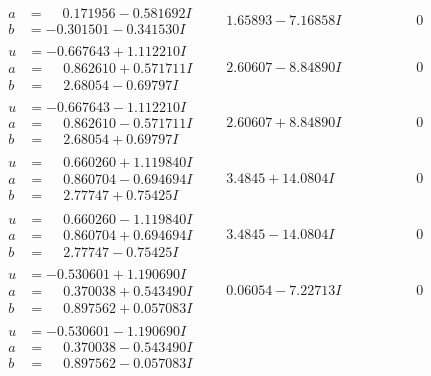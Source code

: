 \documentclass[1p]{elsarticle_modified}
\theoremstyle{definition}
\begin{document}
$$\begin{array}{c|c|c}
\begin{aligned}
a &= \phantom{-}0.171956 - 0.581692 I \\
b &= -0.301501 - 0.341530 I\end{aligned}
 & \phantom{-}1.65893 - 7.16858 I & \phantom{-0.000000 } 0 \\ \hline\begin{aligned}
u &= -0.667643 + 1.112210 I \\
a &= \phantom{-}0.862610 + 0.571711 I \\
b &= \phantom{-}2.68054 - 0.69797 I\end{aligned}
 & \phantom{-}2.60607 - 8.84890 I & \phantom{-0.000000 } 0 \\ \hline\begin{aligned}
u &= -0.667643 - 1.112210 I \\
a &= \phantom{-}0.862610 - 0.571711 I \\
b &= \phantom{-}2.68054 + 0.69797 I\end{aligned}
 & \phantom{-}2.60607 + 8.84890 I & \phantom{-0.000000 } 0 \\ \hline\begin{aligned}
u &= \phantom{-}0.660260 + 1.119840 I \\
a &= \phantom{-}0.860704 - 0.694694 I \\
b &= \phantom{-}2.77747 + 0.75425 I\end{aligned}
 & \phantom{-}3.4845 + 14.0804 I & \phantom{-0.000000 } 0 \\ \hline\begin{aligned}
u &= \phantom{-}0.660260 - 1.119840 I \\
a &= \phantom{-}0.860704 + 0.694694 I \\
b &= \phantom{-}2.77747 - 0.75425 I\end{aligned}
 & \phantom{-}3.4845 - 14.0804 I & \phantom{-0.000000 } 0 \\ \hline\begin{aligned}
u &= -0.530601 + 1.190690 I \\
a &= \phantom{-}0.370038 + 0.543490 I \\
b &= \phantom{-}0.897562 + 0.057083 I\end{aligned}
 & \phantom{-}0.06054 - 7.22713 I & \phantom{-0.000000 } 0 \\ \hline\begin{aligned}
u &= -0.530601 - 1.190690 I \\
a &= \phantom{-}0.370038 - 0.543490 I \\
b &= \phantom{-}0.897562 - 0.057083 I\end{aligned}

\end{array}$$
\end{document}
